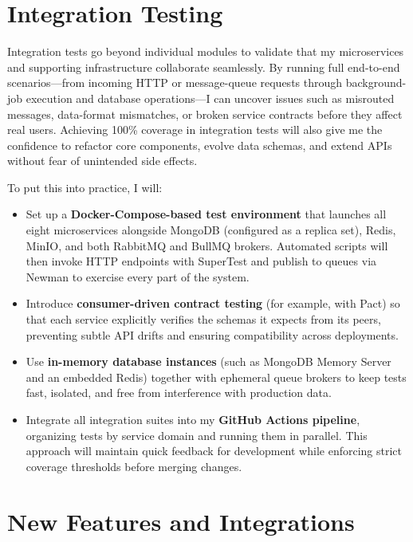 \section{Integration Testing}

Integration tests go beyond individual modules to validate that my microservices and supporting infrastructure collaborate seamlessly. By running full end-to-end scenarios—from incoming HTTP or message-queue requests through background-job execution and database operations—I can uncover issues such as misrouted messages, data-format mismatches, or broken service contracts before they affect real users. Achieving 100\% coverage in integration tests will also give me the confidence to refactor core components, evolve data schemas, and extend APIs without fear of unintended side effects.

To put this into practice, I will:

\begin{itemize}
  \item Set up a \textbf{Docker-Compose-based test environment} that launches all eight microservices alongside MongoDB (configured as a replica set), Redis, MinIO, and both RabbitMQ and BullMQ brokers.  Automated scripts will then invoke HTTP endpoints with SuperTest and publish to queues via Newman to exercise every part of the system.
  \item Introduce \textbf{consumer-driven contract testing} (for example, with Pact) so that each service explicitly verifies the schemas it expects from its peers, preventing subtle API drifts and ensuring compatibility across deployments.
  \item Use \textbf{in-memory database instances} (such as MongoDB Memory Server and an embedded Redis) together with ephemeral queue brokers to keep tests fast, isolated, and free from interference with production data.
  \item Integrate all integration suites into my \textbf{GitHub Actions pipeline}, organizing tests by service domain and running them in parallel.  This approach will maintain quick feedback for development while enforcing strict coverage thresholds before merging changes.
\end{itemize}



\section{New Features and Integrations}

